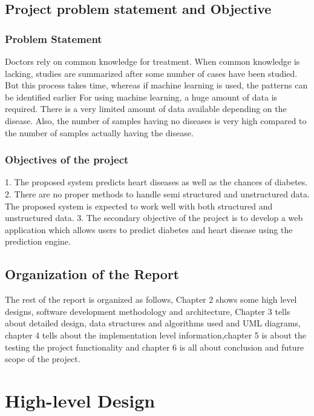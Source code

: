 \documentclass{book}
\begin{document}
       
    
    \section{Project problem statement and Objective}
    
    \subsection{Problem Statement}
    Doctors rely on common knowledge for treatment. When common knowledge is lacking, studies are summarized after some number of cases have been studied. But this process takes time, whereas if machine learning is used, the patterns can be identified earlier
    For using machine learning, a huge amount of data is required. There is a very limited amount of data available depending on the disease. Also, the number of samples having no diseases is very high compared to the number of samples actually having the disease.
    
    \subsection{Objectives of the project}
    1. The proposed system predicts heart diseases as well as the chances of diabetes.
    2. There are no proper methods to handle semi structured and unstructured data. The proposed system is expected to work well with both structured and unstructured data.
    3. The secondary objective of the project is to develop a web application which allows users to predict diabetes and heart disease using the prediction engine.
    
    
    \section{Organization of the Report}
    The rest of the report is organized as follows, Chapter 2 shows some high level designs, software development methodology and architecture, Chapter 3 tells about detailed design, data structures and algorithms used and UML diagrams, chapter 4 tells about the implementation level information,chapter 5 is about the testing the project functionality and chapter 6 is all about conclusion and future scope of the project.
    
    \chapter{High-level Design}
    
\end{document}
